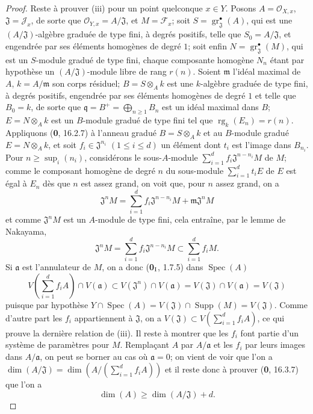 \begin{proof}
Reste à prouver (iii) pour un point quelconque $x\in Y$. Posons
$A=\mathcal O_{X,x}$, $\mathfrak J=\mathcal J_x$, de sorte que
$\mathcal O_{Y,x}=A/\mathfrak J$, et $M=\mathcal F_x$; soit
$S=\operatorname{gr}_{\mathfrak J}^{\bullet}(A)$, qui est une
$(A/\mathfrak J)$-algèbre graduée de type fini, à degrés positifs, telle
que $S_0=A/\mathfrak J$, et engendrée par ses éléments homogènes de degré
$1$; soit enfin
$N=\operatorname{gr}_{\mathfrak J}^{\bullet}(M)$, qui est un $S$-module
gradué de type fini, chaque composante homogène $N_n$ étant par hypothèse
un $(A/\mathfrak J)$-module libre de rang $r(n)$. Soient $\mathfrak m$
l'idéal maximal de $A$, $k=A/\mathfrak m$ son corps résiduel;
$B=S\otimes_A k$ est une $k$-algèbre graduée de type fini, à degrés
positifs, engendrée par ses éléments homogènes de degré $1$ et telle que
$B_0=k$, de sorte que $\mathfrak q=B^+=\bigoplus_{n\geq1}B_n$ est un idéal
maximal dans $B$; $E=N\otimes_A k$ est un $B$-module gradué de type fini
tel que $\operatorname{rg}_k(E_n)=r(n)$. Appliquons (\textbf{0}, 16.2.7) à l'anneau
gradué $B=S\otimes_A k$ et au $B$-module gradué $E=N\otimes_A k$, et soit
$f_i\in\mathfrak J^{n_i}$ $(1\leq i\leq d)$ un élément dont $t_i$ est
l'image dans $B_{n_i}$. Pour $n\geq\sup_i(n_i)$, considérons le sous-$A$-module
$\sum_{i=1}^{d}f_i\mathfrak J^{n-n_i}M$ de $M$; comme le composant homogène
de degré $n$ du sous-module $\sum_{i=1}^{d}t_iE$ de $E$ est égal à
$E_n$ dès que $n$ est assez grand, on voit que, pour $n$ assez grand, on a
\[
\mathfrak J^nM=\sum_{i=1}^{d}f_i\mathfrak J^{n-n_i}M+
\mathfrak m\mathfrak J^nM
\]
et comme $\mathfrak J^nM$ est un $A$-module de type fini, cela entraîne,
par le lemme de Nakayama,
\[
\mathfrak J^nM=\sum_{i=1}^{d}f_i\mathfrak J^{n-n_i}M
\subset\sum_{i=1}^{d}f_iM.
\]
Si $\mathfrak a$ est l'annulateur de $M$, on a donc (\textbf{0}$_{\rm I}$, 1.7.5)
dans $\operatorname{Spec}(A)$
\[
V\left(\sum_{i=1}^{d}f_iA\right)\cap V(\mathfrak a)
\subset V(\mathfrak J^n)\cap V(\mathfrak a)
=V(\mathfrak J)\cap V(\mathfrak a)=V(\mathfrak J)
\]
puisque par hypothèse
$Y\cap\operatorname{Spec}(A)=V(\mathfrak J)\cap\operatorname{Supp}(M)
=V(\mathfrak J)$. Comme d'autre part les $f_i$ appartiennent à
$\mathfrak J$, on a
$V(\mathfrak J)\subset V(\sum_{i=1}^{d}f_iA)$, ce qui prouve la dernière
relation de (iii). Il reste à montrer que les $f_i$ font partie d'un système
de paramètres pour $M$. Remplaçant $A$ par $A/\mathfrak a$ et les $f_i$ par
leurs images dans $A/\mathfrak a$, on peut se borner au cas où
$\mathfrak a=0$; on vient de voir que l'on a
$\dim(A/\mathfrak J)=\dim(A/(\sum_{i=1}^{d}f_iA))$
et il reste donc à prouver (\textbf{0}, 16.3.7) que l'on a
\[
\dim(A)\geq\dim(A/\mathfrak J)+d.
\]


\end{proof}
